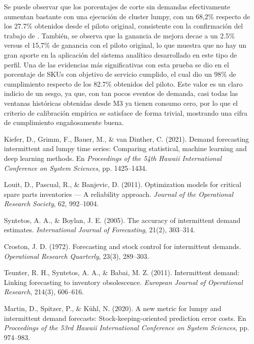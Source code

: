 \documentclass[10pt,a4paper]{article}
\begin{document}
\begin{enumerate}
Se puede observar que los porcentajes de corte sin demandas efectivamente aumentan bastante con una ejecución de cluster lumpy, con un 68,2\% respecto de los 27.7\% obtenidos desde el piloto original, consistente con la confirmación del trabajo de \cite{teunter2011}. También, se observa que la ganancia de mejora decae a un 2.5\% versus el 15,7\% de ganancia con el piloto original, lo que muestra que no hay un gran aporte en la aplicación del sistema analítico desarrollado en este tipo de perfil.
Una de las evidencias más significativas con esta prueba se dio en el porcentaje de SKUs con objetivo de servicio cumplido, el cual dio un 98\% de cumplimiento respecto de los 82.7\% obtenidos del piloto. Este valor es un claro indicio de un sesgo, ya que, con tan pocos eventos de demanda, casi todas las ventanas históricas obtenidas desde M3 ya tienen consumo cero, por lo que el criterio de calibración empírica se satisface de forma trivial, mostrando una cifra de cumplimiento engañosamente buena.
\end{enumerate}

\renewcommand{\refname}{Referencias pregunta 2}
\begin{thebibliography}{}

    Kiefer, D., Grimm, F., Bauer, M., \& van Dinther, C. (2021).
    Demand forecasting intermittent and lumpy time series: Comparing statistical, machine learning and deep learning methods.
    En \textit{Proceedings of the 54th Hawaii International Conference on System Sciences}, pp. 1425--1434.

    Louit, D., Pascual, R., \& Banjevic, D. (2011).
    Optimization models for critical spare parts inventories --- A reliability approach.
    \textit{Journal of the Operational Research Society}, 62, 992--1004.

    Syntetos, A. A., \& Boylan, J. E. (2005).
    The accuracy of intermittent demand estimates.
    \textit{International Journal of Forecasting}, 21(2), 303--314.

    Croston, J. D. (1972).
    Forecasting and stock control for intermittent demands.
    \textit{Operational Research Quarterly}, 23(3), 289--303.

    Teunter, R. H., Syntetos, A. A., \& Babai, M. Z. (2011).
    Intermittent demand: Linking forecasting to inventory obsolescence.
    \textit{European Journal of Operational Research}, 214(3), 606--616.

    Martin, D., Spitzer, P., \& Kühl, N. (2020).
    A new metric for lumpy and intermittent demand forecasts: Stock-keeping-oriented prediction error costs.
    En \textit{Proceedings of the 53rd Hawaii International Conference on System Sciences}, pp. 974--983.


\end{thebibliography}
\end{document}
